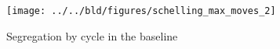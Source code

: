 \documentclass[11pt, a4paper, leqno]{article}
\begin{document}
\begin{figure}
    \caption{Segregation by cycle in the baseline %
    }

    \texttt{[image: ../../bld/figures/schelling\_max\_moves\_2]}

\end{figure}











\end{document}
